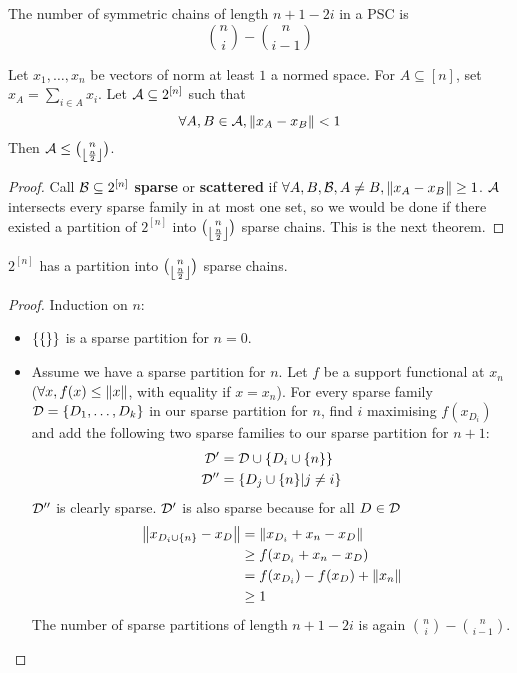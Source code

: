 \documentclass{article}
\begin{document}
The number of symmetric chains of length $n + 1 - 2i$ in a PSC is
$$\binom n i - \binom n{i - 1}$$

\begin{nthm}
  Let $x_1, \dots, x_n$ be vectors of norm at least $1$ a normed space. For $A \subseteq [n]$, set $x_A = \sum_{i \in A} x_i$. Let $\mathcal A \subseteq 2^{[n]}$ such that
  $$\forall A, B \in \mathcal A, \left\lVert x_A - x_B\right\rVert < 1$$
  Then $\mathcal A \le \binom n{\left\lfloor \frac n2\right\rfloor}$.
\end{nthm}
\begin{proof}
  Call $\mathcal B \subseteq 2^{[n]}$ {\bf sparse} or {\bf scattered} if $\forall A, B, \mathcal B, A \ne B, \left\lVert x_A - x_B\right\rVert \ge 1$. $\mathcal A$ intersects every sparse family in at most one set, so we would be done if there existed a partition of $2^{[n]}$ into $\binom n{\left\lfloor \frac n2\right\rfloor}$ sparse chains. This is the next theorem.
\end{proof}

\newlec

\begin{nthm}[Kleitman]
  $2^{[n]}$ has a partition into $\binom n{\left\lfloor \frac n2\right\rfloor}$ sparse chains.
\end{nthm}
\begin{proof}
  Induction on $n$:
  \begin{itemize}
    \item $\{\{\empty\}\}$ is a sparse partition for $n = 0$.
    \item Assume we have a sparse partition for $n$. Let $f$ be a support functional at $x_n$ ($\forall x, f(x) \le \left\lVert x\right\rVert$, with equality if $x = x_n$). For every sparse family $\mathcal D = \{D_1, \dots, D_k\}$ in our sparse partition for $n$, find $i$ maximising $f(x_{D_i})$ and add the following two sparse families to our sparse partition for $n + 1$: 
    \begin{align*}
      \mathcal D' & = \mathcal D \cup \{D_i \cup \{n\}\} \\
      \mathcal D'' & = \{D_j \cup \{n\} | j \ne i\}
    \end{align*}
    $\mathcal D''$ is clearly sparse. $\mathcal D'$ is also sparse because for all 
    $D \in \mathcal D$
    \begin{align*}
      \left\lVert x_{D_i \cup \{n\}} - x_D\right\rVert
      & = \left\lVert x_{D_i} + x_n - x_D\right\rVert \\
      & \ge f(x_{D_i} + x_n - x_D) \\
      & = f(x_{D_i}) - f(x_D) + \left\lVert x_n\right\rVert \\
      & \ge 1
    \end{align*}
    The number of sparse partitions of length $n + 1 - 2i$ is again $\binom ni - \binom n{i - 1}$.
  \end{itemize}
\end{proof}
\end{document}
